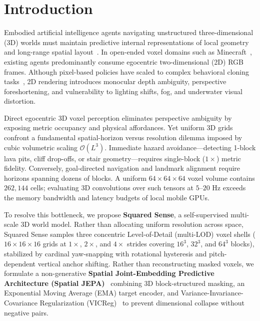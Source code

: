 \documentclass[runningheads]{llncs}
\begin{document}
\section{Introduction}

Embodied artificial intelligence agents navigating unstructured three-dimensional (3D) worlds must maintain predictive internal representations of local geometry and long-range spatial layout~\cite{hafner2023dreamerv3,baker2022vpt}. In open-ended voxel domains such as Minecraft~\cite{guss2019minerl,fan2022minedojo}, existing agents predominantly consume egocentric two-dimensional (2D) RGB frames. Although pixel-based policies have scaled to complex behavioral cloning tasks~\cite{baker2022vpt}, 2D rendering introduces monocular depth ambiguity, perspective foreshortening, and vulnerability to lighting shifts, fog, and underwater visual distortion.

Direct egocentric 3D voxel perception eliminates perspective ambiguity by exposing metric occupancy and physical affordances. Yet uniform 3D grids confront a fundamental spatial-horizon versus resolution dilemma imposed by cubic volumetric scaling $\mathcal{O}(L^3)$. Immediate hazard avoidance—detecting 1-block lava pits, cliff drop-offs, or stair geometry—requires single-block ($1\times$) metric fidelity. Conversely, goal-directed navigation and landmark alignment require horizons spanning dozens of blocks. A uniform $64\times64\times64$ voxel volume contains $262{,}144$ cells; evaluating 3D convolutions over such tensors at $5\text{--}20\text{ Hz}$ exceeds the memory bandwidth and latency budgets of local mobile GPUs.

To resolve this bottleneck, we propose \textbf{Squared Sense}, a self-supervised multi-scale 3D world model. Rather than allocating uniform resolution across space, Squared Sense samples three concentric Level-of-Detail (multi-LOD) voxel shells ($16\times16\times16$ grids at $1\times$, $2\times$, and $4\times$ strides covering $16^3$, $32^3$, and $64^3$ blocks), stabilized by cardinal yaw-snapping with rotational hysteresis and pitch-dependent vertical anchor shifting. Rather than reconstructing masked voxels, we formulate a non-generative \textbf{Spatial Joint-Embedding Predictive Architecture (Spatial JEPA)}~\cite{assran2023ijepa} combining 3D block-structured masking, an Exponential Moving Average (EMA) target encoder, and Variance-Invariance-Covariance Regularization (VICReg)~\cite{bardes2022vicreg} to prevent dimensional collapse without negative pairs.
\end{document}
